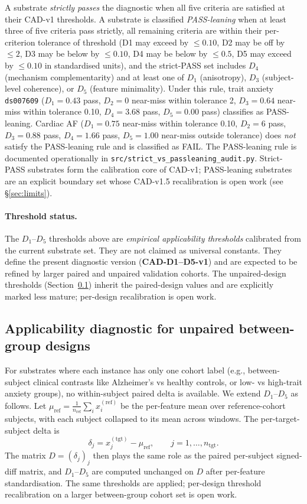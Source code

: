 \documentclass[11pt,a4paper]{article}
\begin{document}
A substrate \emph{strictly passes} the diagnostic when all five criteria are satisfied at their CAD-v1 thresholds. A substrate is classified \emph{PASS-leaning} when at least three of five criteria pass strictly, all remaining criteria are within their per-criterion tolerance of threshold (D1 may exceed by $\leq 0.10$, D2 may be off by $\leq 2$, D3 may be below by $\leq 0.10$, D4 may be below by $\leq 0.5$, D5 may exceed by $\leq 0.10$ in standardised units), and the strict-PASS set includes $D_4$ (mechanism complementarity) and at least one of $D_1$ (anisotropy), $D_3$ (subject-level coherence), or $D_5$ (feature minimality). Under this rule, trait anxiety \texttt{ds007609} ($D_1=0.43$ pass, $D_2=0$ near-miss within tolerance 2, $D_3=0.64$ near-miss within tolerance 0.10, $D_4=3.68$ pass, $D_5=0.00$ pass) classifies as PASS-leaning. Cardiac AF ($D_1=0.75$ near-miss within tolerance 0.10, $D_2=6$ pass, $D_3=0.88$ pass, $D_4=1.66$ pass, $D_5=1.00$ near-miss outside tolerance) does \emph{not} satisfy the PASS-leaning rule and is classified as FAIL. The PASS-leaning rule is documented operationally in \texttt{src/strict\_vs\_passleaning\_audit.py}. Strict-PASS substrates form the calibration core of CAD-v1; PASS-leaning substrates are an explicit boundary set whose CAD-v1.5 recalibration is open work (see \S\ref{sec:limits}).

\paragraph{Threshold status.} The $D_1$--$D_5$ thresholds above are \emph{empirical applicability thresholds} calibrated from the current substrate set. They are not claimed as universal constants. They define the present diagnostic version (\textbf{CAD-D1--D5-v1}) and are expected to be refined by larger paired and unpaired validation cohorts. The unpaired-design thresholds (Section~\ref{sec:method-diagnostic-unpaired}) inherit the paired-design values and are explicitly marked less mature; per-design recalibration is open work.

\subsection{Applicability diagnostic for unpaired between-group designs}\label{sec:method-diagnostic-unpaired}

For substrates where each instance has only one cohort label (e.g., between-subject clinical contrasts like Alzheimer's vs healthy controls, or low- vs high-trait anxiety groups), no within-subject paired delta is available. We extend $D_1$--$D_5$ as follows. Let $\mu_{\mathrm{ref}} = \frac{1}{n_{\mathrm{ref}}} \sum_i x^{(\mathrm{ref})}_i$ be the per-feature mean over reference-cohort subjects, with each subject collapsed to its mean across windows. The per-target-subject delta is
\[
  \delta_j = x^{(\mathrm{tgt})}_j - \mu_{\mathrm{ref}}, \qquad j = 1, \ldots, n_{\mathrm{tgt}}.
\]
The matrix $D = (\delta_j)_j$ then plays the same role as the paired per-subject signed-diff matrix, and $D_1$--$D_5$ are computed unchanged on $D$ after per-feature standardisation. The same thresholds are applied; per-design threshold recalibration on a larger between-group cohort set is open work.
\end{document}
